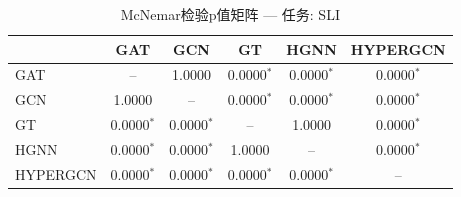 \begin{table}[htbp]
\centering
\caption{McNemar检验p值矩阵 — 任务: SLI}
\label{tab:mcnemar_SLI}
\begin{tabular}{lccccc}
\toprule
 & GAT & GCN & GT & HGNN & HYPERGCN \\
\midrule
GAT & -- & 1.0000 & 0.0000$^*$ & 0.0000$^*$ & 0.0000$^*$ \\
GCN & 1.0000 & -- & 0.0000$^*$ & 0.0000$^*$ & 0.0000$^*$ \\
GT & 0.0000$^*$ & 0.0000$^*$ & -- & 1.0000 & 0.0000$^*$ \\
HGNN & 0.0000$^*$ & 0.0000$^*$ & 1.0000 & -- & 0.0000$^*$ \\
HYPERGCN & 0.0000$^*$ & 0.0000$^*$ & 0.0000$^*$ & 0.0000$^*$ & -- \\
\bottomrule
\end{tabular}
\end{table}